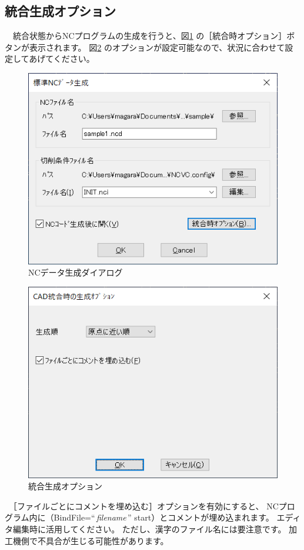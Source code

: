\subsection{統合生成オプション}
　統合状態からNCプログラムの生成を行うと、図\ref{fig:option1.png} の［統合時オプション］ボタンが表示されます。
図\ref{fig:option2.png} のオプションが設定可能なので、状況に合わせて設定してあげてください。

\begin{minipage}[t]{0.5\textwidth}
\begin{figure}[H]
\centering
\includegraphics[scale=0.7]{No1/fig/option1.png}
\caption{NCデータ生成ダイアログ}
\label{fig:option1.png}
\end{figure}
\end{minipage}
\begin{minipage}[t]{0.5\textwidth}
\begin{figure}[H]
\centering
\includegraphics[scale=0.7]{No1/fig/option2.png}
\caption{統合生成オプション}
\label{fig:option2.png}
\end{figure}
\end{minipage}

\vspace*{1zh}
　［ファイルごとにコメントを埋め込む］オプションを有効にすると、
NCプログラム内に（BindFile=``\,\textit{filename}\,'' start）とコメントが埋め込まれます。
エディタ編集時に活用してください。
ただし、漢字のファイル名には要注意です。
加工機側で不具合が生じる可能性があります。
